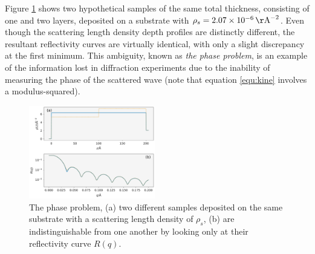 \documentclass[
 reprint,
 superscriptaddress,
 amsmath,amssymb,
 aps,
]{revtex4-1}
\newcommand{\angstrom}{\rm{\AA}}
\begin{document}
Figure \ref{fig:phase_problem_sld} shows two hypothetical samples of the same total thickness, consisting of one and two layers, deposited on a substrate with $\rho_s = \SI{2.07e-6}{\angstrom^{-2}}$.
Even though the scattering length density depth profiles are distinctly different, the resultant reflectivity curves are virtually identical, with only a slight discrepancy at the first minimum.
This ambiguity, known as \emph{the phase problem}, is an example of the information lost in diffraction experiments due to the inability of measuring the phase of the scattered wave (note that equation \ref{equ:kine} involves a modulus-squared).
\begin{figure}
    \includegraphics[width=0.49\textwidth]{phase_problem_SLD.pdf}
    \caption{The phase problem, (a) two different samples deposited on the same substrate with a scattering length density of $\rho_s$, (b) are indistinguishable from one another by looking only at their reflectivity curve $R(q)$.}
    \label{fig:phase_problem_sld}
\end{figure}
\end{document}
